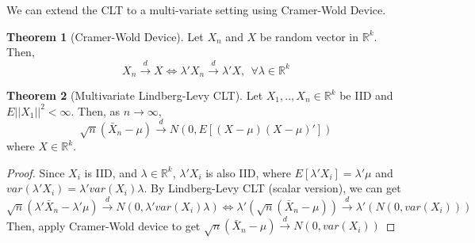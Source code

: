 \documentclass[12pt]{article}
\theoremstyle{definition}
\theoremstyle{property}
\theoremstyle{example}
\newtheorem{theorem}{Theorem}[section]
\begin{document}
We can extend the CLT to a multi-variate setting using Cramer-Wold Device.\par
\begin{mdframed}[backgroundcolor=green!5] 
\begin{theorem}[Cramer-Wold Device]
Let $X_n$ and $X$ be random vector in $\mathbb{R}^k$. Then, 
\[
X_n\xrightarrow{d}X\iff\lambda'X_n\xrightarrow{d}\lambda'X, \ \ \forall\lambda\in\mathbb{R}^k
\]
\end{theorem}

\begin{theorem}[Multivariate Lindberg-Levy CLT]
Let $X_1,..,X_n\in\mathbb{R}^k$ be IID and $E|| X_1||^2<\infty$. Then, as $n\to\infty$, 
\[
\sqrt{n}(\bar{X}_n-\mu)\xrightarrow{d}N(0,E[(X-\mu)(X-\mu)'])
\]
where $X\in\mathbb{R}^k$.
\begin{proof}
Since $X_i$ is IID, and $\lambda\in\mathbb{R}^k$, $\lambda'X_i$ is also IID, where $E[\lambda'X_i]=\lambda'\mu$ and $var(\lambda'X_i)=\lambda'var(X_i)\lambda$. By Lindberg-Levy CLT (scalar version), we can get
\[
\sqrt{n}(\lambda'\bar{X}_n-\lambda'\mu)\xrightarrow{d}N(0,\lambda'var(X_i)\lambda) \iff \lambda'(\sqrt{n}(\bar{X}_n-\mu))\xrightarrow{d} \lambda'(N(0,var(X_i)))
\]
Then, apply Cramer-Wold device to get $\sqrt{n}(\bar{X}_n-\mu)\xrightarrow{d}N(0,var(X_i))$
\end{proof}
\end{theorem}
\end{mdframed}\par
\end{document}
